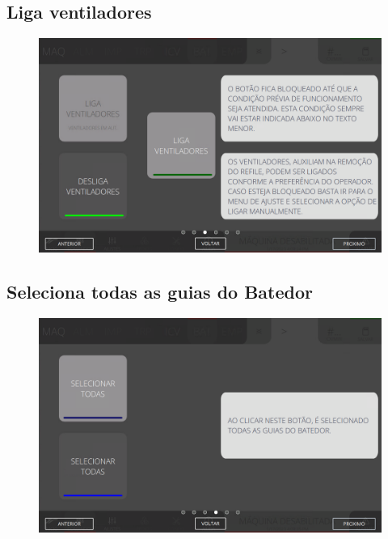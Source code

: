 \newpage
\thispagestyle{fancy}
\vspace*{40 pt}
\subsection{Liga ventiladores}
\vspace*{\fill}
\begin{figure}[h]
    \centering
    \includegraphics[width=576 px,height=360 px]{src/imagesICV/07-scout/commands/3.png}
\end{figure}
\vspace*{\fill}

\newpage
\thispagestyle{fancy}
\vspace*{40 pt}
\subsection{Seleciona todas as guias do Batedor}
\vspace*{\fill}
\begin{figure}[h]
    \centering
    \includegraphics[width=576 px,height=360 px]{src/imagesICV/07-scout/commands/4.png}
\end{figure}
\vspace*{\fill}

